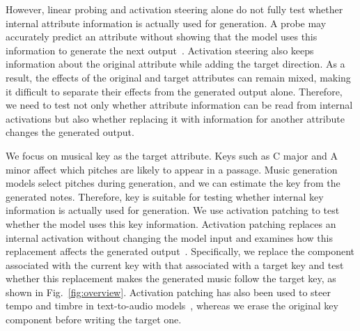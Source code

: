 \documentclass{article}
\begin{document}
However, linear probing and activation steering alone do not fully test whether internal attribute information is actually used for generation.
A probe may accurately predict an attribute without showing that the model uses this information to generate the next output~\cite{belinkov2022probing}.
Activation steering also keeps information about the original attribute while adding the target direction.
As a result, the effects of the original and target attributes can remain mixed, making it difficult to separate their effects from the generated output alone.
Therefore, we need to test not only whether attribute information can be read from internal activations but also whether replacing it with information for another attribute changes the generated output.

We focus on musical key as the target attribute.
Keys such as C major and A minor affect which pitches are likely to appear in a passage.
Music generation models select pitches during generation, and we can estimate the key from the generated notes.
Therefore, key is suitable for testing whether internal key information is actually used for generation.
We use activation patching to test whether the model uses this key information.
Activation patching replaces an internal activation without changing the model input and examines how this replacement affects the generated output~\cite{geiger2021causal,geiger2024das}.
Specifically, we replace the component associated with the current key with that associated with a target key and test whether this replacement makes the generated music follow the target key, as shown in Fig.~\ref{fig:overview}.
Activation patching has also been used to steer tempo and timbre in text-to-audio models~\cite{facchiano2025patching}, whereas we erase the original key component before writing the target one.
\end{document}
